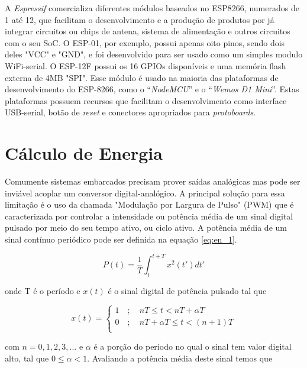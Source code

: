 A \textit{Espressif} comercializa diferentes módulos baseados no ESP8266, numerados de 1 até 12, que facilitam o desenvolvimento e a produção de produtos por já integrar circuitos ou chips de antena, sistema de alimentação e outros circuitos com o seu SoC. O ESP-01, por exemplo, possui apenas oito pinos, sendo dois deles "VCC" e "GND", e foi desenvolvido para ser usado como um simples modulo WiFi-serial. O ESP-12F possui os 16 GPIOs disponíveis e uma memória flash externa de 4MB "SPI". Esse módulo é usado na maioria das plataformas de desenvolvimento do ESP-8266, como o “\textit{NodeMCU}” e o “\textit{Wemos D1 Mini}”. Estas plataformas possuem recursos que facilitam o desenvolvimento como interface USB-serial, botão de \textit{reset} e conectores apropriados para \textit{protoboards}.

\section{Cálculo de Energia}

Comumente sistemas embarcados precisam prover saídas analógicas mas pode ser inviável acoplar um conversor digital-analógico. A principal solução para essa limitação é o uso da chamada "Modulação por Largura de Pulso" (PWM) que é caracterizada por controlar a intensidade ou potência média de um sinal digital pulsado por meio do seu tempo ativo, ou ciclo ativo. A potência média de um sinal contínuo periódico pode ser definida na equação \ref{eq:en_1}.

\begin{equation}
\label{eq:en_1}
P(t) = \frac{1}{T} \int_{t}^{t+T}x^2(t')dt'
\end{equation}

\noindent onde T é o período e $x(t)$ é o sinal digital de potência pulsado tal que

\begin{equation}
    \label{eq:en_2}
    x(t) =  \left\{
            \begin{array}{ll}
                1 \quad ; \quad nT \leq t < nT+\alpha T \\
                0 \quad ; \quad nT+\alpha T \leq t < (n+1)T\\
            \end{array}
            \right.
\end{equation}

\noindent com $n = 0, 1, 2, 3, ...$ e $\alpha$ é a porção do período no qual o sinal tem valor digital alto, tal que $0 \leq \alpha < 1$. Avaliando a potência média deste sinal temos que 

